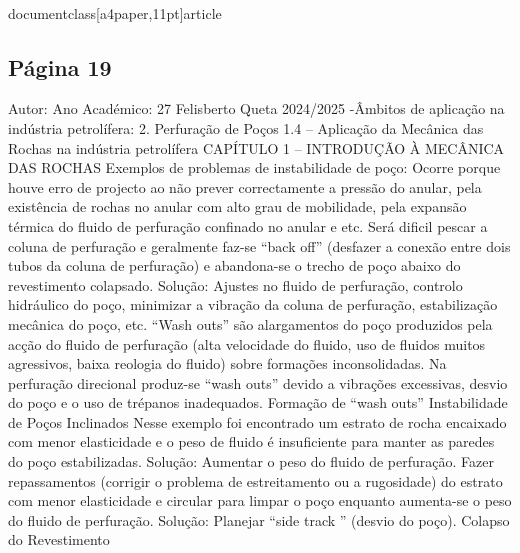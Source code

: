 \\documentclass[a4paper,11pt]{article}
\begin{document}
\subsection*{Página 19}
Autor:
Ano Académico:
27
Felisberto Queta
2024/2025
-Âmbitos de aplicação na indústria petrolífera:
2. Perfuração de Poços
1.4 – Aplicação da Mecânica das Rochas na indústria petrolífera
CAPÍTULO 1 – INTRODUÇÃO À MECÂNICA DAS ROCHAS
Exemplos de problemas de instabilidade de poço:
Ocorre porque houve erro de projecto ao 
não prever correctamente a pressão do 
anular, pela existência de rochas no anular 
com alto grau de mobilidade, pela expansão 
térmica do fluido de perfuração confinado no 
anular e etc.
Será dificil pescar a coluna de perfuração e 
geralmente faz-se “back off” (desfazer a 
conexão entre dois tubos da coluna de 
perfuração) e abandona-se o trecho de poço 
abaixo do revestimento colapsado.
Solução: Ajustes no fluido de perfuração, 
controlo hidráulico do poço, minimizar a 
vibração da coluna de perfuração, 
estabilização mecânica do poço, etc.
“Wash outs” são alargamentos do poço 
produzidos pela acção do fluido de perfuração 
(alta velocidade do fluido, uso de fluidos 
muitos agressivos, baixa reologia do fluido) 
sobre formações inconsolidadas.
Na perfuração direcional produz-se “wash 
outs” devido a vibrações excessivas, desvio do 
poço e o uso de trépanos inadequados.
Formação de 
“wash outs”
Instabilidade de 
Poços Inclinados
Nesse exemplo foi encontrado um estrato de 
rocha encaixado com menor elasticidade e o 
peso de fluido é insuficiente para manter as 
paredes do poço estabilizadas.
Solução: Aumentar o peso do fluido de 
perfuração. Fazer repassamentos (corrigir o 
problema de estreitamento ou a rugosidade) do 
estrato com menor elasticidade e circular para 
limpar o poço enquanto aumenta-se o peso do 
fluido de perfuração.
Solução: Planejar “side track ” (desvio 
do poço).
Colapso do 
Revestimento
\end{document}
